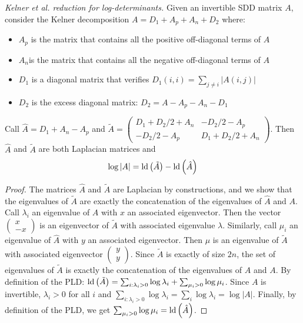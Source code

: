\begin{lemma}\emph{Kelner et al. reduction for log-determinants. }Given
an invertible SDD matrix $A$, consider the Kelner decomposition $A=D_{1}+A_{p}+A_{n}+D_{2}$
where:
\begin{itemize}
\item $A_{p}$ is the matrix that contains all the positive off-diagonal
terms of $A$
\item $A_{n}$is the matrix that contains all the negative off-diagonal
terms of $A$
\item $D_{1}$ is a diagonal matrix that verifies $D_{1}\left(i,i\right)=\sum_{j\neq i}\left|A\left(i,j\right)\right|$
\item $D_{2}$ is the excess diagonal matrix: $D_{2}=A-A_{p}-A_{n}-D_{1}$
\end{itemize}
Call $\hat{A}=D_{1}+A_{n}-A_{p}$ and $\tilde{A}=\left(\begin{array}{cc}
D_{1}+D_{2}/2+A_{n} & -D_{2}/2-A_{p}\\
-D_{2}/2-A_{p} & D_{1}+D_{2}/2+A_{n}
\end{array}\right)$. Then $\hat{A}$ and $\tilde{A}$ are both Laplacian matrices and
\[
\log\left|A\right|=\text{\textnormal{ld}}\left(\tilde{A}\right)-\text{\textnormal{ld}}\left(\hat{A}\right)
\]


\end{lemma}

\begin{proof}The matrices $\hat{A}$ and $\tilde{A}$ are Laplacian
by constructions, and we show that the eigenvalues of $\tilde{A}$
are exactly the concatenation of the eigenvalues of $\hat{A}$ and
$A$. Call $\lambda_{i}$ an eigenvalue of $A$ with $x$ an associated
eigenvector. Then the vector $\left(\begin{array}{c}
x\\
-x
\end{array}\right)$ is an eigenvector of $\tilde{A}$ with associated eigenvalue $\lambda$.
Similarly, call $\mu_{i}$ an eigenvalue of $\hat{A}$ with $y$ an
associated eigenvector. Then $\mu$ is an eigenvalue of $\tilde{A}$
with associated eigenvector $\left(\begin{array}{c}
y\\
y
\end{array}\right)$. Since $\tilde{A}$ is exactly of size $2n$, the set of eigenvalues
of $\tilde{A}$ is exactly the concatenation of the eigenvalues of
$\hat{A}$ and $A$. By definition of the PLD: $\text{\textnormal{ld}}\left(\tilde{A}\right)=\sum_{i:\lambda_{i}>0}\log\lambda_{i}+\sum_{\mu_{i}>0}\log\mu_{i}$.
Since $A$ is invertible, $\lambda_{i}>0$ for all $i$ and $\sum_{i:\lambda_{i}>0}\log\lambda_{i}=\sum_{i}\log\lambda_{i}=\log\left|A\right|$.
Finally, by definition of the PLD, we get $\sum_{\mu_{i}>0}\log\mu_{i}=\text{\textnormal{ld}}\left(\hat{A}\right)$.

\end{proof}

